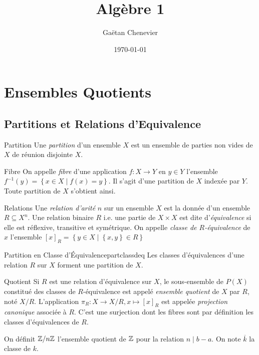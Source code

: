 \documentclass{cours}
\title{Algèbre 1}
\author{Gaëtan Chenevier}
\date{\today}
\begin{document}
\section{Ensembles Quotients}
\subsection{Partitions et Relations d'Equivalence}
\begin{définition}{Partition}{}
    Une \emph{partition} d'un ensemble $X$ est un ensemble de parties non vides de $X$ de réunion disjointe $X$.
\end{définition}

\begin{définition}{Fibre}{}
    On appelle \emph{fibre} d'une application $f : X \rightarrow Y$ en $y \in Y$ l'ensemble $f^{-1}(y) = \left\{x \in X \mid f(x) = y\right\}$. Il s'agit d'une partition de $X$ indexée par $Y$. Toute partition de $X$ s'obtient ainsi.
\end{définition}

\begin{définition}{Relations}{}
    Une \emph{relation d'arité} $n$ sur un ensemble $X$ est la donnée d'un ensemble $R \subseteq X^{n}$. Une relation binaire $R$ i.e. une partie de $X\times X$ est dite d'\emph{équivalence} si elle est réflexive, transitive et symétrique. On appelle \emph{classe de $R$-équivalence} de $x$ l'ensemble $\left[x\right]_{R} = \left\{y \in X \mid \left\{x, y\right\} \in R\right\}$
\end{définition}

\begin{propositionfr}{Partition en Classe d'Équivalence}{partclassdeq}
    Les classes d'équivalences d'une relation $R$ sur $X$ forment une partition de $X$.
\end{propositionfr}

\begin{définition}{Quotient}{}
    Si $R$ est une relation d'équivalence sur $X$, le sous-ensemble de $P(X)$ constitué des classes de $R$-équivalence est appelé \emph{ensemble quotient} de $X$ par $R$, noté $X/R$. L'application $\pi_{R} : X \rightarrow X/R, x \mapsto \left[x\right]_{R}$ est appelée \emph{projection canonique} associée à $R$. C'est une surjection dont les fibres sont par définition les classes d'équivalences de $R$.
\end{définition}

\begin{example}
    On définit $\mathbb{Z}/n\mathbb{Z}$ l'ensemble quotient de $\mathbb{Z}$ pour la relation $n \mid b - a$. On note $\overline{k}$ la classe de $k$.
\end{example}
\end{document}
